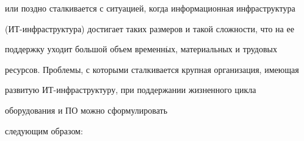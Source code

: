 или поздно сталкивается с ситуацией, когда информационная инфраструктура 

(ИТ-инфраструктура) достигает таких размеров и такой сложности, что на ее 

поддержку уходит большой объем временн$\acute{\mbox{ы}}$х, материальных и трудовых 

ресурсов. Проблемы, с которыми сталкивается крупная организация, имеющая 

развитую ИТ-инфраструктуру, при поддержании жизненного цикла 

оборудования и ПО можно сформулировать 

следующим образом:



\pagebreak



\noindent

